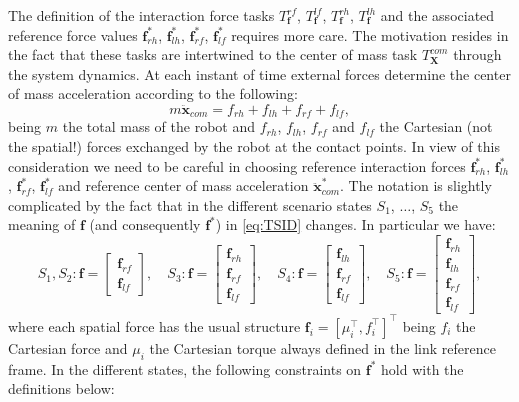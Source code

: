 \documentclass[12pt,a4paper,twoside]{article}
\begin{document}
The definition of the interaction force tasks $T^{rf}_{\bm f}$, $T^{lf}_{\bm f}$, $T^{rh}_{\bm f}$, $T^{lh}_{\bm f}$ and the associated reference force values ${{\bm f}}_{rh}^*$, ${{\bm f}}_{lh}^*$, ${{\bm f}}_{rf}^*$, ${{\bm f}}_{lf}^*$ requires more care. The motivation resides in the fact that these tasks are intertwined to the center of mass task $T^{com}_{\bm X}$ through the system dynamics. At each instant of time external forces determine the center of mass acceleration according to the following:
\begin{equation}
m \ddot {\bm x}_{com} = {f}_{rh} + {f}_{lh} + {f}_{rf} + {f}_{lf},
\end{equation}
being $m$ the total mass of the robot and ${f}_{rh}$, ${f}_{lh}$, ${f}_{rf}$ and ${f}_{lf}$ the Cartesian (not the spatial!) forces exchanged by the robot at the contact points. In view of this consideration we need to be careful in choosing reference interaction forces ${{\bm f}}_{rh}^*$, ${{\bm f}}_{lh}^*$, ${{\bm f}}_{rf}^*$, ${{\bm f}}_{lf}^*$ and reference center of mass acceleration $\ddot {\bm x}^*_{com}$. The notation is slightly complicated by the fact that in the different scenario states $S_1$, $\dots$, $S_5$ the meaning of $\bm f$ (and consequently $\bm f^*$) in \eqref{eq:TSID} changes. In particular we have:
\begin{equation}
S_1, S_2: \bm f = \begin{bmatrix} {\bm f}_{rf} \\ {\bm f}_{lf} \end{bmatrix},  \quad
S_3: \bm f = \begin{bmatrix} {\bm f}_{rh} \\ {\bm f}_{rf} \\ {\bm f}_{lf} \end{bmatrix},  \quad
S_4: \bm f = \begin{bmatrix}  {\bm f}_{lh} \\ {\bm f}_{rf} \\ {\bm f}_{lf} \end{bmatrix},  \quad
S_5: \bm f = \begin{bmatrix} {\bm f}_{rh} \\ {\bm f}_{lh} \\ {\bm f}_{rf} \\ {\bm f}_{lf} \end{bmatrix}, 
\end{equation}
where each spatial force has the usual structure $\bm f_i = \left[ \mu_i^\top, f_i^\top \right]^\top$ being $f_i$ the Cartesian force and $\mu_i$ the Cartesian torque always defined in the link reference frame. In the different states, the following constraints on $\bm f^*$ hold with the definitions below:
\end{document}
